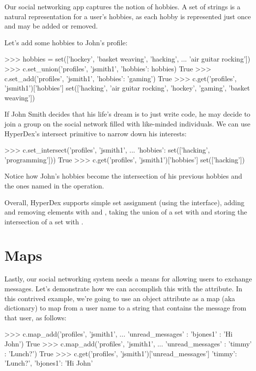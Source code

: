 Our social networking app captures the notion of hobbies.  A set of strings is a
natural representation for a user's hobbies, as each hobby is represented just
once and may be added or removed.

Let's add some hobbies to John's profile:

\begin{pythoncode}
>>> hobbies = set(['hockey', 'basket weaving', 'hacking',
...                'air guitar rocking'])
>>> c.set_union('profiles', 'jsmith1', {'hobbies': hobbies})
True
>>> c.set_add('profiles', 'jsmith1', {'hobbies': 'gaming'})
True
>>> c.get('profiles', 'jsmith1')['hobbies']
set(['hacking', 'air guitar rocking', 'hockey', 'gaming', 'basket weaving'])
\end{pythoncode}

If John Smith decides that his life's dream is to just write code, he may decide
to join a group on the social network filled with like-minded individuals.  We
can use HyperDex's intersect primitive to narrow down his interests:

\begin{pythoncode}
>>> c.set_intersect('profiles', 'jsmith1',
...                 {'hobbies': set(['hacking', 'programming'])})
True
>>> c.get('profiles', 'jsmith1')['hobbies']
set(['hacking'])
\end{pythoncode}

Notice how John's hobbies become the intersection of his previous hobbies and
the ones named in the operation.

Overall, HyperDex supports simple set assignment (using the 
interface), adding and removing elements with  and
, taking the union of a set with  and storing
the intersection of a set with .

\section{Maps}
\label{sec:data-types:maps}

Lastly, our social networking system needs a means for allowing users to
exchange messages.  Let's demonstrate how we can accomplish this with the
 attribute. In this contrived example, we're going to use
an object attribute as a map (aka dictionary) to map from a user name to a
string that contains the message from that user, as follows:

\begin{pythoncode}
>>> c.map_add('profiles', 'jsmith1',
...           {'unread_messages' : {'bjones1' : 'Hi John'}})
True
>>> c.map_add('profiles', 'jsmith1',
...           {'unread_messages' : {'timmy' : 'Lunch?'}})
True
>>> c.get('profiles', 'jsmith1')['unread_messages']
{'timmy': 'Lunch?', 'bjones1': 'Hi John'}
\end{pythoncode}

